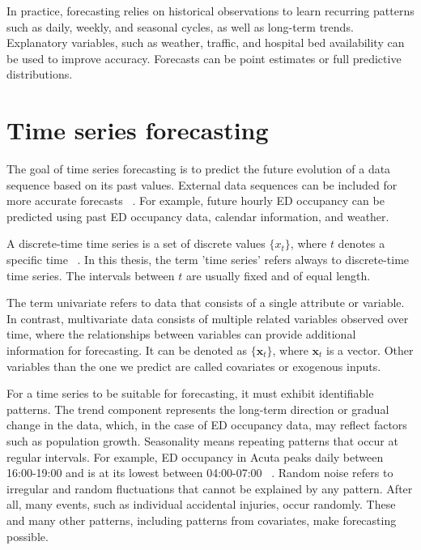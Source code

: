 In practice, forecasting relies on historical observations to learn recurring patterns such as daily, weekly, and seasonal cycles, as well as long-term trends. Explanatory variables, such as weather, traffic, and hospital bed availability can be used to improve accuracy. Forecasts can be point estimates or full predictive distributions. ~\cite{tuominen_forecasting_2024}

\section{Time series forecasting}

The goal of time series forecasting is to predict the future evolution of a data sequence based on its past values. External data sequences can be included for more accurate forecasts ~\cite{hyndman2018forecasting}. For example, future hourly ED occupancy can be predicted using past ED occupancy data, calendar information, and weather.

A discrete-time time series is a set of discrete values $\{x_t\}$, where $t$ denotes a specific time ~\cite{brockwell_introduction_2016}. In this thesis, the term 'time series' refers always to discrete-time time series. The intervals between $t$ are usually fixed and of equal length.

The term univariate refers to data that consists of a single attribute or variable. In contrast, multivariate data consists of multiple related variables observed over time, where the relationships between variables can provide additional information for forecasting. It can be denoted as $\{\mathbf{x}_{t}\}$, where $\mathbf{x}_t$ is a vector. Other variables than the one we predict are called covariates or exogenous inputs.~\cite{brockwell_introduction_2016}

For a time series to be suitable for forecasting, it must exhibit identifiable patterns. The trend component represents the long-term direction or gradual change in the data, which, in the case of ED occupancy data, may reflect factors such as population growth. Seasonality means repeating patterns that occur at regular intervals. For example, ED occupancy in Acuta peaks daily between 16:00-19:00 and is at its lowest between 04:00-07:00 ~\cite{tuominen_forecasting_2024}.
Random noise refers to irregular and random fluctuations that cannot be explained by any pattern. After all, many events, such as individual accidental injuries, occur randomly. These and many other patterns, including patterns from covariates, make forecasting possible. ~\cite{brockwell_introduction_2016}


